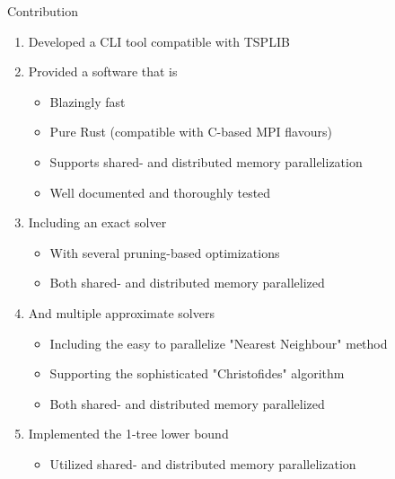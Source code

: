 \begin{frame}{Contribution}
\label{pg:lastpage} %
  \vspace{-0.25cm}
  \begin{enumerate}
    \item Developed a CLI tool compatible with TSPLIB
      \pause
    \item Provided a software that is
      \begin{itemize}
        \item Blazingly fast
        \item Pure Rust (compatible with C-based MPI flavours)
        \item Supports shared- and distributed memory parallelization
        \item Well documented and thoroughly tested
      \end{itemize}
      \pause
    \item Including an exact solver
      \begin{itemize}
        \item With several pruning-based optimizations
        \item Both shared- and distributed memory parallelized
      \end{itemize}
      \pause
    \item And multiple approximate solvers
      \begin{itemize}
        \item Including the easy to parallelize "Nearest Neighbour" method
        \item Supporting the sophisticated "Christofides" algorithm
        \item Both shared- and distributed memory parallelized
      \end{itemize}
      \pause
    \item Implemented the 1-tree lower bound
      \begin{itemize}
        \item Utilized shared- and distributed memory parallelization
      \end{itemize}
  \end{enumerate}
\end{frame}


